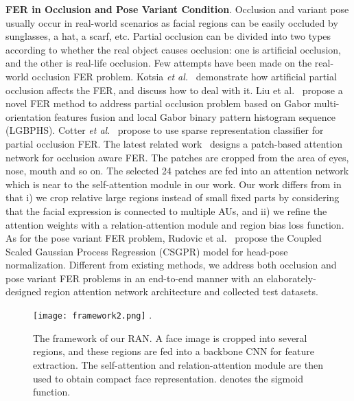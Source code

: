 \documentclass[journal]{IEEEtran}
\newcommand{\peng}[1]{\textcolor[rgb]{0,0,0}{#1}}
\begin{document}
\textbf{FER in Occlusion and Pose Variant Condition}.
Occlusion and variant pose usually occur in real-world scenarios as facial regions can be easily occluded by sunglasses, a hat, a scarf, etc.
Partial occlusion can be divided into two types according to whether the real object causes occlusion: one is artificial occlusion, and the other is real-life occlusion. Few attempts have been made on the real-world occlusion FER problem. Kotsia \textit{et al.}~\cite{kotsia2008analysis} demonstrate how artificial partial occlusion affects the FER, and discuss how to deal with it. Liu et al.~\cite{6846619} propose a novel FER method to address partial occlusion problem based on Gabor multi-orientation features fusion and local Gabor binary pattern histogram sequence (LGBPHS). Cotter \textit{et al}.~\cite{cotter2010sparse,cotter2010weighted} propose to use sparse representation classifier for partial occlusion FER. 
\peng{The latest related work~\cite{8576656} designs a patch-based attention network for occlusion aware FER. The patches are cropped from the area of eyes, nose, mouth and so on. The selected 24 patches are fed into an attention network which is near to the self-attention module in our work. Our work differs from \cite{8576656} in that i) we crop relative large regions instead of small fixed parts by considering that the facial expression is connected to multiple AUs, and ii) we refine the attention weights with a relation-attention module and region bias loss function.}
As for the pose variant FER problem, Rudovic et al.~\cite{6341749} propose the Coupled Scaled Gaussian Process Regression (CSGPR) model for head-pose normalization. 
\peng{Different from existing methods, we address both occlusion and pose variant FER problems in an end-to-end manner with an elaborately-designed region attention network architecture and collected test datasets.}


\begin{figure*}[!t]
\centering
\texttt{[image: framework2.png]}
\DeclareGraphicsExtensions.
\caption{The framework of our RAN. A face image is cropped into several regions, and these regions are fed into a backbone CNN for feature extraction. The self-attention and relation-attention module are then used to obtain compact face representation. \raisebox{.5pt}{\textcircled{\raisebox{-.9pt} {}}} denotes the sigmoid function.  }
\label{fig:framework}
\end{figure*}
\end{document}
